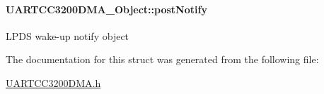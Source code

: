 \paragraph[{post\+Notify}]{ U\+A\+R\+T\+C\+C3200\+D\+M\+A\+\_\+\+Object\+::post\+Notify}\label{struct_u_a_r_t_c_c3200_d_m_a___object_a6d32751736762f68296c08d756aef75a}
L\+P\+D\+S wake-\/up notify object 

The documentation for this struct was generated from the following file\+:\begin{DoxyCompactItemize}
\item 
\hyperlink{_u_a_r_t_c_c3200_d_m_a_8h}{U\+A\+R\+T\+C\+C3200\+D\+M\+A.\+h}\end{DoxyCompactItemize}

